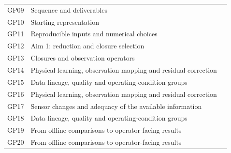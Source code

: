 \begin{longtable}{@{}p{0.5in}p{4.80in}p{0.4in}@{}}
GP09 & Sequence and deliverables & \hyperref[subsec:sequence-and-deliverables]{\pageref*{subsec:sequence-and-deliverables}}\\
GP10 & Starting representation & \hyperref[subsec:starting-representation]{\pageref*{subsec:starting-representation}}\\
GP11 & Reproducible inputs and numerical choices & \hyperref[subsec:reproducible-inputs-and-numerical-choices]{\pageref*{subsec:reproducible-inputs-and-numerical-choices}}\\
GP12 & Aim 1: reduction and closure selection & \hyperref[subsec:aim-1-reduction-and-closure-selection]{\pageref*{subsec:aim-1-reduction-and-closure-selection}}\\
GP13 & Closures and observation operators & \hyperref[subsec:closures-and-observation-operators]{\pageref*{subsec:closures-and-observation-operators}}\\
GP14 & Physical learning, observation mapping and residual correction & \hyperref[subsec:physical-learning-observation-mapping-and-residual-correction]{\pageref*{subsec:physical-learning-observation-mapping-and-residual-correction}}\\
GP15 & Data lineage, quality and operating-condition groups & \hyperref[subsec:data-lineage-quality-and-operating-condition-groups]{\pageref*{subsec:data-lineage-quality-and-operating-condition-groups}}\\
GP16 & Physical learning, observation mapping and residual correction & \hyperref[subsec:physical-learning-observation-mapping-and-residual-correction]{\pageref*{subsec:physical-learning-observation-mapping-and-residual-correction}}\\
GP17 & Sensor changes and adequacy of the available information & \hyperref[subsec:sensor-changes-and-adequacy-of-the-available-information]{\pageref*{subsec:sensor-changes-and-adequacy-of-the-available-information}}\\
GP18 & Data lineage, quality and operating-condition groups & \hyperref[subsec:data-lineage-quality-and-operating-condition-groups]{\pageref*{subsec:data-lineage-quality-and-operating-condition-groups}}\\
GP19 & From offline comparisons to operator-facing results & \hyperref[subsec:from-offline-comparisons-to-operator-facing-results]{\pageref*{subsec:from-offline-comparisons-to-operator-facing-results}}\\
GP20 & From offline comparisons to operator-facing results & \hyperref[subsec:from-offline-comparisons-to-operator-facing-results]{\pageref*{subsec:from-offline-comparisons-to-operator-facing-results}}\\

\end{longtable}
